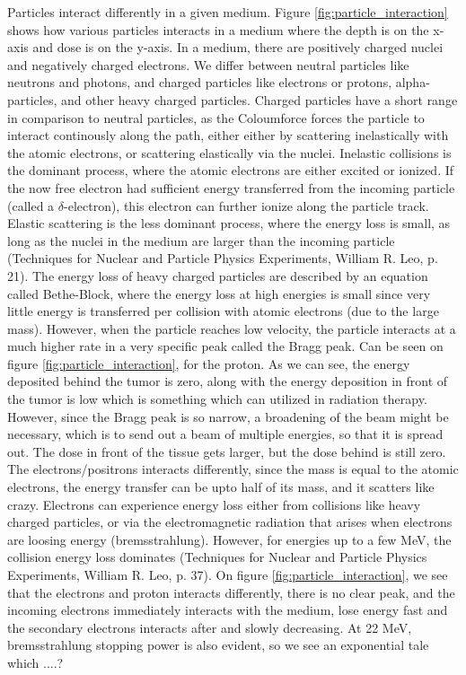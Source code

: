 Particles interact differently in a given medium. Figure \ref{fig:particle_interaction} shows how various particles interacts in a medium where the depth is on the x-axis and dose is on the y-axis. In a medium, there are positively charged nuclei and negatively charged electrons. We differ between neutral particles like neutrons and photons, and charged particles like electrons or protons, alpha-particles, and other heavy charged particles. Charged particles have a short range in comparison to neutral particles, as the Coloumforce forces the particle to interact continously along the path, either either by scattering inelastically with the atomic electrons, or scattering elastically via the nuclei. Inelastic collisions is the dominant process, where the atomic electrons are either excited or ionized. If the now free electron had sufficient energy transferred from the incoming particle (called a $\delta$-electron), this electron can further ionize along the particle track. Elastic scattering is the less dominant process, where the energy loss is small, as long as the nuclei in the medium are larger than the incoming particle (Techniques for Nuclear and Particle Physics Experiments, William R. Leo, p. 21). The energy loss of heavy charged particles are described by an equation called Bethe-Block, where the energy loss at high energies is small since very little energy is transferred per collision with atomic electrons (due to the large mass). However, when the particle reaches low velocity, the particle interacts at a much higher rate in a very specific peak called the Bragg peak. Can be seen on figure \ref{fig:particle_interaction}, for the proton. As we can see, the energy deposited behind the tumor is zero, along with the energy deposition in front of the tumor is low which is something which can utilized in radiation therapy. However, since the Bragg peak is so narrow, a broadening of the beam might be necessary, which is to send out a beam of multiple energies, so that it is spread out. The dose in front of the tissue gets larger, but the dose behind is still zero. The electrons/positrons interacts differently, since the mass is equal to the atomic electrons, the energy transfer can be upto half of its mass, and it scatters like crazy. Electrons can experience energy loss either from collisions like heavy charged particles, or via the electromagnetic radiation that arises when electrons are loosing energy (bremsstrahlung). However, for energies up to a few MeV, the collision energy loss dominates (Techniques for Nuclear and Particle Physics Experiments, William R. Leo, p. 37). On figure \ref{fig:particle_interaction}, we see that  the electrons and proton interacts differently, there is no clear peak, and the incoming electrons immediately interacts with the medium, lose energy fast and the secondary electrons interacts after and slowly decreasing. At 22 MeV, bremsstrahlung stopping power is also evident, so we see an exponential tale which ....? \\

